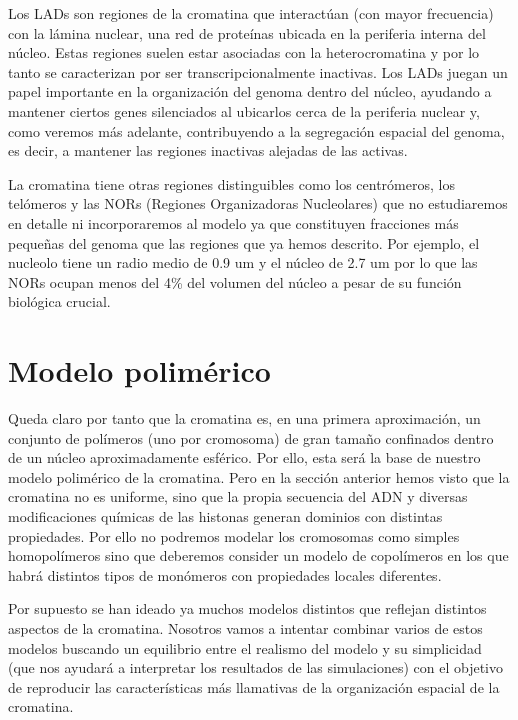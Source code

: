 Los LADs son regiones de la cromatina que interactúan (con mayor frecuencia) con la lámina nuclear, una red de proteínas ubicada en la periferia interna del núcleo. Estas regiones suelen estar asociadas con la heterocromatina y por lo tanto se caracterizan por ser transcripcionalmente inactivas. Los LADs juegan un papel importante en la organización del genoma dentro del núcleo, ayudando a mantener ciertos genes silenciados al ubicarlos cerca de la periferia nuclear y, como veremos más adelante, contribuyendo a la segregación espacial del genoma, es decir, a mantener las regiones inactivas alejadas de las activas.

La cromatina tiene otras regiones distinguibles como los centrómeros, los telómeros y las NORs (Regiones Organizadoras Nucleolares) que no estudiaremos en detalle ni incorporaremos al modelo ya que constituyen fracciones más pequeñas del genoma que las regiones que ya hemos descrito. Por ejemplo, el nucleolo tiene un radio medio de 0.9 $\text{um}$ y el núcleo de 2.7 $\text{um}$ \cite{Milo2009} por lo que las NORs ocupan menos del 4\% del volumen del núcleo a pesar de su función biológica crucial.

\section{Modelo polimérico}

Queda claro por tanto que la cromatina es, en una primera aproximación, un conjunto de polímeros (uno por cromosoma) de gran tamaño confinados dentro de un núcleo aproximadamente esférico. Por ello, esta será la base de nuestro modelo polimérico de la cromatina. Pero en la sección anterior hemos visto que la cromatina no es uniforme, sino que la propia secuencia del ADN y diversas modificaciones químicas de las histonas generan dominios con distintas propiedades. Por ello no podremos modelar los cromosomas como simples homopolímeros sino que deberemos consider un modelo de copolímeros en los que habrá distintos tipos de monómeros con propiedades locales diferentes.

Por supuesto se han ideado ya muchos modelos distintos que reflejan distintos aspectos de la cromatina. Nosotros vamos a intentar combinar varios de estos modelos buscando un equilibrio entre el realismo del modelo y su simplicidad (que nos ayudará a interpretar los resultados de las simulaciones) con el objetivo de reproducir las características más llamativas de la organización espacial de la cromatina.

